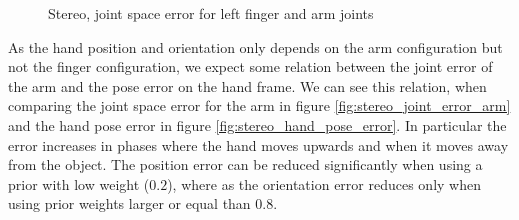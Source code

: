 \begin{figure}
\centering
{}
%
\caption{Stereo, joint space error for left finger and arm joints}
\label{fig:stereo_joint_error}
\end{figure}

As the hand position and orientation only depends on the arm configuration but not the finger configuration, we expect some relation between the joint error of the arm and the pose error on the hand frame. We can see this relation, when comparing the joint space error for the arm in figure \ref{fig:stereo_joint_error_arm} and the hand pose error in figure \ref{fig:stereo_hand_pose_error}. In particular the error increases in phases where the hand moves upwards and when it moves away from the object. The position error can be reduced significantly when using a prior with low weight ($0.2$), where as the orientation error reduces only when using prior weights larger or equal than $0.8$.

